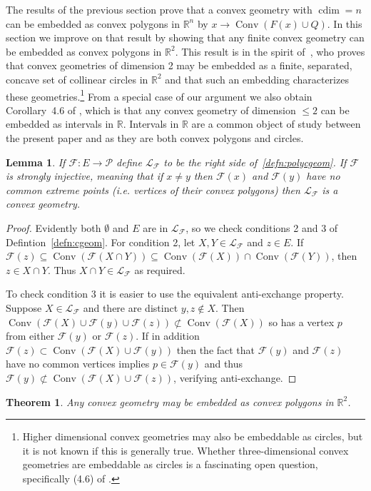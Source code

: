 \documentclass[12pt]{elsarticle}
\theoremstyle{plain}
\newtheorem{theorem}{Theorem}
\newtheorem{lemma}{Lemma}
\theoremstyle{definition}
\newcommand{\F}{\mathcal{F}}
\newcommand{\Poly}{\mathcal{P}}
\newcommand{\cgeom}{\mathcal{L}}
\DeclareMathOperator{\Hull}{Conv}
\DeclareMathOperator{\cdim}{cdim}
\begin{document}
The results of the previous section prove that a convex geometry with $\cdim=n$ can be embedded as convex polygons in $\mathbb{R}^{n}$ by $x \rightarrow \Hull(F(x) \cup Q)$.  In this section we improve on that result by showing that any finite convex geometry can be embedded as convex polygons in $\mathbb{R}^2$.  This result is in the spirit of~\cite{C}, who proves that convex geometries of dimension 2 may be embedded as a finite, separated, concave set of collinear circles in $\mathbb{R}^2$ and that such an embedding characterizes these geometries.\footnote{Higher dimensional convex geometries may also be embeddable as circles, but it is not known if this is generally true. Whether three-dimensional convex geometries are embeddable as circles is a fascinating open question, specifically (4.6) of \cite{C}.}  From a special case of our argument we also obtain Corollary~4.6 of \cite{C}, which is that any convex geometry of dimension $\leq 2$ can be embedded as intervals in $\mathbb{R}$. Intervals in $\mathbb{R}$ are a common object of study between the present paper and \cite{C} as they are both convex polygons and circles.

\begin{lemma}\label{lem:polycgeom}
If $\F:E\to\Poly$ define $\cgeom_{\F}$ to be the right side of~\eqref{defn:polycgeom}.  If $\F$ is strongly injective, meaning that if $x\neq y$ then $\F(x)$ and $\F(y)$ have no common extreme points (i.e. vertices of their convex polygons) then $\cgeom_{\F}$ is a convex geometry.
\end{lemma}
\begin{proof}
Evidently both $\emptyset$ and $E$ are in $\cgeom_{\F}$, so we check conditions 2 and 3 of Defintion~\ref{defn:cgeom}. For condition 2, let $X,Y\in\cgeom_{\F}$ and $z\in E$.  If $\F(z) \subseteq\Hull(\F(X \cap Y)) \subseteq \Hull(\F(X)) \cap \Hull(\F(Y))$, then $z \in X \cap Y$. Thus $X \cap Y\in\cgeom_{\F}$ as required.

To check condition 3 it is easier to use the equivalent anti-exchange property. Suppose $X\in\cgeom_{\F}$ and there are distinct $y,z\not\in X$. Then $\Hull(\F(X)\cup\F(y)\cup\F(z))\not\subset\Hull(\F(X))$ so has a vertex $p$ from either $\F(y)$ or $\F(z)$.  If in addition $\F(z)\subset\Hull(\F(X)\cup\F(y))$ then the fact that $\F(y)$ and $\F(z)$ have no common vertices implies $p\in\F(y)$ and thus $\F(y)\not\subset\Hull(\F(X)\cup\F(z))$, verifying anti-exchange.
\end{proof}

\begin{theorem}\label{thm:PolygonEmbedding}
Any convex geometry may be embedded as convex polygons in $\mathbb{R}^2$.
\end{theorem}
\end{document}
